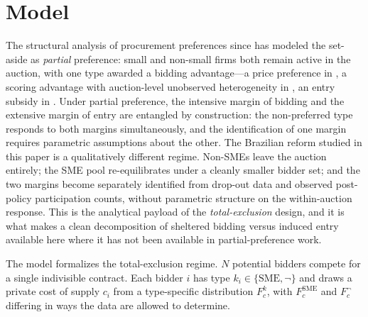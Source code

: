 \section{Model}\label{sec:model}

The structural analysis of procurement preferences since \citet{marion2007} has modeled the set-aside as \emph{partial} preference: small and non-small firms both remain active in the auction, with one type awarded a bidding advantage---a price preference in \citeauthor{marion2007}, a scoring advantage with auction-level unobserved heterogeneity in \citet{krasnokutskaya2011}, an entry subsidy in \citet{atheyseira2011}. Under partial preference, the intensive margin of bidding and the extensive margin of entry are entangled by construction: the non-preferred type responds to both margins simultaneously, and the identification of one margin requires parametric assumptions about the other. The Brazilian reform studied in this paper is a qualitatively different regime. Non-SMEs leave the auction entirely; the SME pool re-equilibrates under a cleanly smaller bidder set; and the two margins become separately identified from drop-out data and observed post-policy participation counts, without parametric structure on the within-auction response. This is the analytical payload of the \emph{total-exclusion} design, and it is what makes a clean decomposition of sheltered bidding versus induced entry available here where it has not been available in partial-preference work.

The model formalizes the total-exclusion regime. $N$ potential bidders compete for a single indivisible contract. Each bidder $i$ has type $k_i \in \{\text{SME}, \neg\}$ and draws a private cost of supply $c_i$ from a type-specific distribution $F_c^k$, with $F_c^{\text{SME}}$ and $F_c^{\neg}$ differing in ways the data are allowed to determine.

